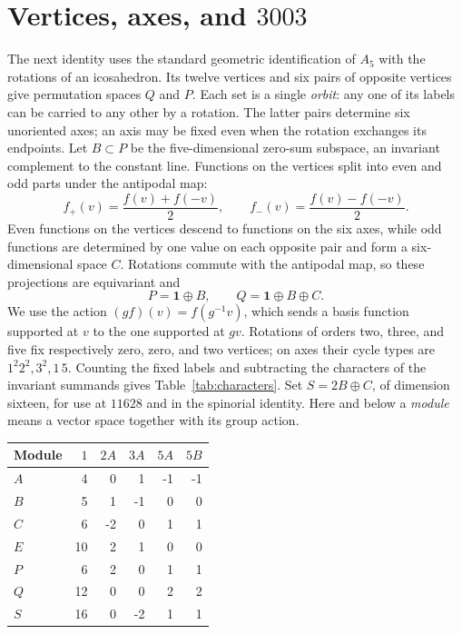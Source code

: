 \documentclass[11pt,a4paper]{article}
\begin{document}
\section[Vertices, axes, and 3003]{Vertices, axes, and $3003$}\label{sec:vertices}

The next identity uses the standard geometric identification of \(A_5\) with the rotations of an icosahedron. Its twelve vertices and six pairs of opposite vertices give permutation spaces \(Q\) and \(P\). Each set is a single \emph{orbit}: any one of its labels can be carried to any other by a rotation. The latter pairs determine six unoriented axes; an axis may be fixed even when the rotation exchanges its endpoints. Let \(B\subset P\) be the five-dimensional zero-sum subspace, an invariant complement to the constant line. Functions on the vertices split into even and odd parts under the antipodal map:
\[
f_+(v)=\frac{f(v)+f(-v)}2,\qquad
f_-(v)=\frac{f(v)-f(-v)}2.
\]
Even functions on the vertices descend to functions on the six axes, while odd functions are determined by one value on each opposite pair and form a six-dimensional space \(C\). Rotations commute with the antipodal map, so these projections are equivariant and
\[
P=\mathbf1\oplus B,\qquad Q=\mathbf1\oplus B\oplus C.
\]
We use the action \((gf)(v)=f(g^{-1}v)\), which sends a basis function supported at \(v\) to the one supported at \(gv\). Rotations of orders two, three, and five fix respectively zero, zero, and two vertices; on axes their cycle types are \(1^2 2^2,3^2,1\,5\). Counting the fixed labels and subtracting the characters of the invariant summands gives Table~\ref{tab:characters}. Set \(S=2B\oplus C\), of dimension sixteen, for use at \(11628\) and in the spinorial identity. Here and below a \emph{module} means a vector space together with its group action.

\begin{center}
\begin{minipage}{\linewidth}
\label{tab:characters}
\centering
\renewcommand{\arraystretch}{1.12}
\begin{tabular}{lrrrrr}
\toprule
Module & \(1\) & \(2A\) & \(3A\) & \(5A\) & \(5B\)\\
\midrule
\(A\) & 4 & 0 & 1 & -1 & -1\\
\(B\) & 5 & 1 & -1 & 0 & 0\\
\(C\) & 6 & -2 & 0 & 1 & 1\\
\(E\) & 10 & 2 & 1 & 0 & 0\\
\(P\) & 6 & 2 & 0 & 1 & 1\\
\(Q\) & 12 & 0 & 0 & 2 & 2\\
\(S\) & 16 & 0 & -2 & 1 & 1\\
\bottomrule
\end{tabular}
\end{minipage}
\end{center}
\end{document}
